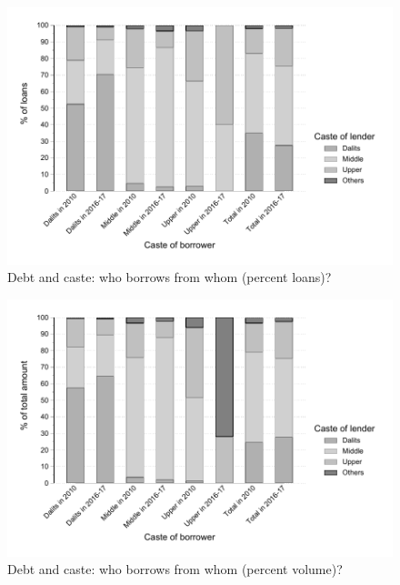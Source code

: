 \documentclass[a4paper, 11pt, onecolumn]{article}
\begin{document}
\begin{figure}[h!]
\center
\includegraphics[width=12cm]{contengency_borrower_loan_stata.pdf}
\caption{Debt and caste: who borrows from whom (percent loans)?}
\label{cont:loans}
\end{figure}

\begin{figure}[ht!]
\center
\includegraphics[width=12cm]{contengency_borrower_amount_stata.pdf}
\caption{Debt and caste: who borrows from whom (percent volume)?}
\label{cont:volume}
\end{figure}
\end{document}
